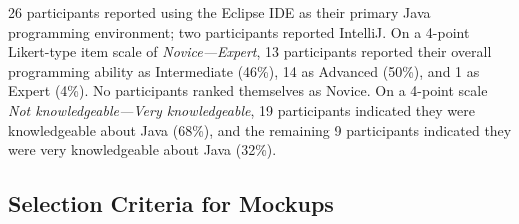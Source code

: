 \documentclass[conference]{IEEEtran}
\begin{document}
26 participants reported using the Eclipse IDE as their primary Java programming environment; two participants reported IntelliJ. On a 4-point Likert-type item scale of \emph{Novice---Expert}, 13 participants reported their overall programming ability as Intermediate (46\%), 14 as Advanced (50\%), and 1 as Expert (4\%). No participants ranked themselves as Novice. On a 4-point scale \emph{Not knowledgeable---Very knowledgeable}, 19 participants indicated they were knowledgeable about Java (68\%), and the remaining 9 participants indicated they were very knowledgeable about Java (32\%).





\subsection{Selection Criteria for Mockups}
\end{document}
